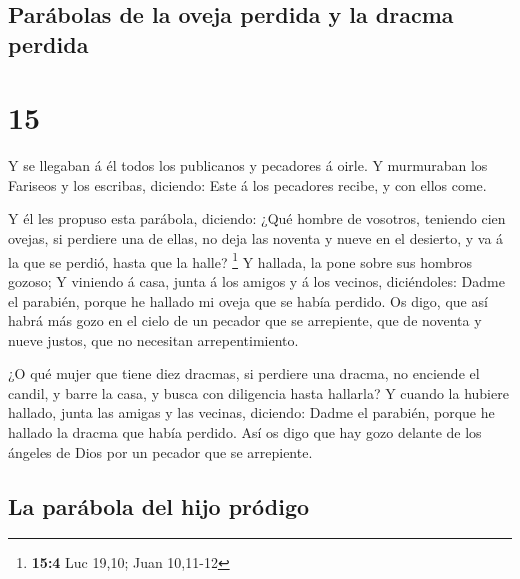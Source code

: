 \hypertarget{paruxe1bolas-de-la-oveja-perdida-y-la-dracma-perdida}{%
\subsection{Parábolas de la oveja perdida y la dracma
perdida}\label{paruxe1bolas-de-la-oveja-perdida-y-la-dracma-perdida}}

\hypertarget{section-14}{%
\section{15}\label{section-14}}

 Y se llegaban á él todos los publicanos y pecadores á
oirle.  Y murmuraban los Fariseos y los escribas,
diciendo: Este á los pecadores recibe, y con ellos come.

 Y él les propuso esta parábola, diciendo: 
¿Qué hombre de vosotros, teniendo cien ovejas, si perdiere una de ellas,
no deja las noventa y nueve en el desierto, y va á la que se perdió,
hasta que la halle? \footnote{\textbf{15:4} Luc 19,10; Juan 10,11-12}
 Y hallada, la pone sobre sus hombros gozoso;
 Y viniendo á casa, junta á los amigos y á los vecinos,
diciéndoles: Dadme el parabién, porque he hallado mi oveja que se había
perdido.  Os digo, que así habrá más gozo en el cielo de
un pecador que se arrepiente, que de noventa y nueve justos, que no
necesitan arrepentimiento.

 ¿O qué mujer que tiene diez dracmas, si perdiere una
dracma, no enciende el candil, y barre la casa, y busca con diligencia
hasta hallarla?  Y cuando la hubiere hallado, junta las
amigas y las vecinas, diciendo: Dadme el parabién, porque he hallado la
dracma que había perdido.  Así os digo que hay gozo
delante de los ángeles de Dios por un pecador que se arrepiente.

\hypertarget{la-paruxe1bola-del-hijo-pruxf3digo}{%
\subsection{La parábola del hijo
pródigo}\label{la-paruxe1bola-del-hijo-pruxf3digo}}

